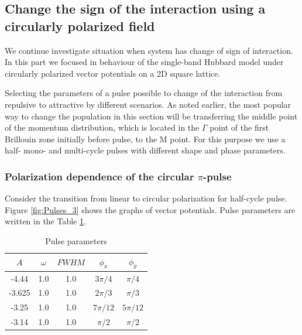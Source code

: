 \subsection{Change the sign of the interaction using a circularly polarized field}


We continue investigate situation when system has change of sign of interaction. In this part we focused in behaviour of the single-band Hubbard model under circularly polarized vector potentials on a 2D square lattice. 

Selecting the parameters of a pulse possible to change of the interaction from repulsive to attractive by different scenarios. As noted earlier, the most popular way to change the population in this section will be transferring the middle point of the momentum distribution, which is located in the $\Gamma$ point of the first Brillouin zone initially before pulse, to the M point. For this purpose we use a half- mono- and multi-cycle pulses with different shape and phase parameters. 


\subsubsection{Polarization dependence of the circular $\pi$-pulse}

Consider the transition from linear to circular polarization for half-cycle pulse. Figure \ref{fig:Pulses_3} shows the graphs of vector potentials. Pulse parameters are written in the Table  \ref{table:3}. 

\begin{table}[h!]
\begin{center}
  \begin{tabular}{ | c | c | c | c | c |}
    \hline
    $A$ & $\omega$ & $FWHM$ & $\phi_x$ & $\phi_y$ \\ \hline
    -4.44 & 1.0 & 1.0 & $3\pi /4$ & $\pi /4$  \\ \hline
    -3.625 & 1.0 & 1.0 & $2\pi /3$ & $\pi /3$   \\ \hline
    -3.25 & 1.0 & 1.0 & $7\pi /12$ & $5\pi /12$   \\ \hline
    -3.14 & 1.0 & 1.0 & $\pi /2$ & $\pi /2$   \\    
    \hline
  \end{tabular}
\caption{Pulse parameters}
\label{table:3}
\end{center}
\end{table}

